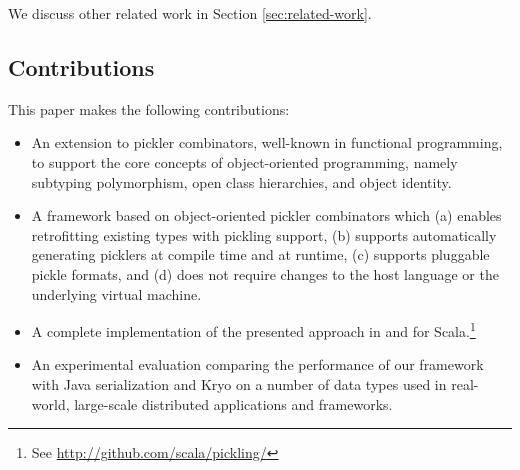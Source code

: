 We discuss other related work in Section \ref{sec:related-work}.

\subsection{Contributions}

This paper makes the following contributions:

\begin{itemize}

\item An extension to pickler combinators, well-known in functional
programming, to support the core concepts of object-oriented programming,
namely subtyping polymorphism, open class hierarchies, and object identity.

\item A framework based on object-oriented pickler combinators which (a)
enables retrofitting existing types with pickling support, (b) supports
automatically generating picklers at compile time and at runtime, (c) supports
pluggable pickle formats, and (d) does not require changes to the host
language or the underlying virtual machine.

\item A complete implementation of the presented approach in and for Scala.\footnote{See \url{http://github.com/scala/pickling/}}

\item An experimental evaluation comparing the performance of our framework
with Java serialization and Kryo on a number of data types used in real-world,
large-scale distributed applications and frameworks.

\end{itemize}








